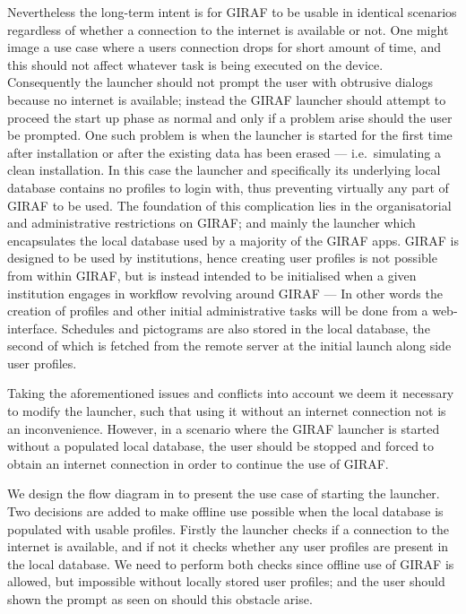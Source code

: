 Nevertheless the long-term intent is for GIRAF to be usable in identical scenarios regardless of whether a connection to the internet is available or not.
One might image a use case where a users connection drops for short amount of time, and this should not affect whatever task is being executed on the device.
Consequently the launcher should not prompt the user with obtrusive dialogs because no internet is available; instead the GIRAF launcher should attempt to proceed the start up phase as normal and only if a problem arise should the user be prompted.
One such problem is when the launcher is started for the first time after installation or after the existing data has been erased --- i.e.\ simulating a clean installation. 
In this case the launcher and specifically its underlying local database contains no profiles to login with, thus preventing virtually any part of GIRAF to be used.
The foundation of this complication lies in the organisatorial and administrative restrictions on GIRAF; and mainly the launcher which encapsulates the local database used by a majority of the GIRAF apps.
GIRAF is designed to be used by institutions, hence creating user profiles is not possible from within GIRAF, but is instead intended to be initialised when a given institution engages in workflow revolving around GIRAF --- In other words the creation of profiles and other initial administrative tasks will be done from a web-interface.
Schedules and pictograms are also stored in the local database, the second of which is fetched from the remote server at the initial launch along side user profiles.

\bigskip

Taking the aforementioned issues and conflicts into account we deem it necessary to modify the launcher, such that using it without an internet connection not is an inconvenience.
However, in a scenario where the GIRAF launcher is started without a populated local database, the user should be stopped and forced to obtain an internet connection in order to continue the use of GIRAF.

We design the flow diagram in  to present the use case of starting the launcher.
Two decisions are added to make offline use possible when the local database is populated with usable profiles.
Firstly the launcher checks if a connection to the internet is available, and if not it checks whether any user profiles are present in the local database.
We need to perform both checks since offline use of GIRAF is allowed, but impossible without locally stored user profiles; and the user should shown the prompt as seen on  should this obstacle arise.

